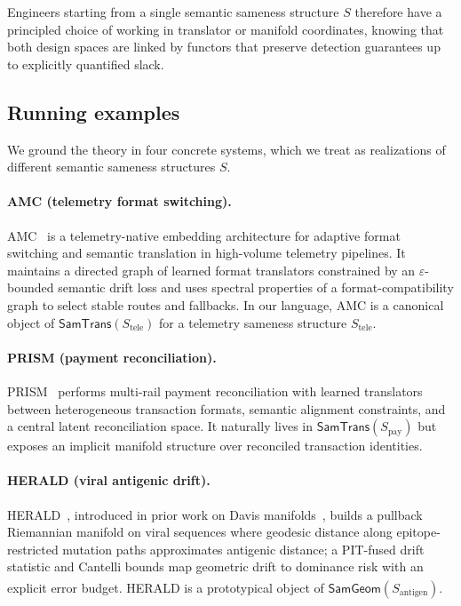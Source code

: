 \documentclass[11pt]{article}
\newcommand{\SamTrans}{\mathsf{SamTrans}}
\newcommand{\SamGeom}{\mathsf{SamGeom}}
\begin{document}
Engineers starting from a single semantic sameness structure $S$ therefore have a principled choice
of working in translator or manifold coordinates, knowing that both design spaces are linked by
functors that preserve detection guarantees up to explicitly quantified slack.


\subsection{Running examples}

We ground the theory in four concrete systems, which we treat as realizations of different semantic
sameness structures $S$.

\paragraph{AMC (telemetry format switching).}
AMC~\cite{davis2025amc} is a telemetry-native embedding architecture for adaptive format switching 
and semantic translation in high-volume telemetry pipelines. It maintains a directed graph of 
learned format translators constrained by an $\varepsilon$-bounded semantic drift loss and uses 
spectral properties of a format-compatibility graph to select stable routes and fallbacks. In our 
language, AMC is a canonical object of $\SamTrans(S_{\mathrm{tele}})$ for a telemetry sameness 
structure $S_{\mathrm{tele}}$.

\paragraph{PRISM (payment reconciliation).}
PRISM~\cite{davis2025prism} performs multi-rail payment reconciliation with learned translators 
between heterogeneous transaction formats, semantic alignment constraints, and a central latent 
reconciliation space. It naturally lives in $\SamTrans(S_{\mathrm{pay}})$ but exposes an implicit 
manifold structure over reconciled transaction identities.

\paragraph{HERALD (viral antigenic drift).}
HERALD~\cite{davis2025herald}, introduced in prior work on Davis manifolds~\cite{davis2025manifold}, 
builds a pullback Riemannian manifold on viral sequences where geodesic distance along 
epitope-restricted mutation paths approximates antigenic distance; a PIT-fused drift statistic 
and Cantelli bounds map geometric drift to dominance risk with an explicit error budget. 
HERALD is a prototypical object of $\SamGeom(S_{\mathrm{antigen}})$.\,\textsuperscript{\!}\!
\end{document}
